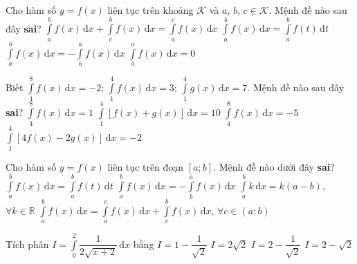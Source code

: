 \begin{ex}%
	Cho hàm số $y=f(x)$ liên tục trên khoảng $\mathscr{K}$ và $a$, $b$, $c\in \mathscr{K}$. Mệnh đề nào sau đây {\bf sai}?
	\choice
	{\True $\displaystyle\int\limits_a^b f(x)\mathrm{\,d}x+\displaystyle\int\limits_c^b f(x)\mathrm{\,d}x=\displaystyle\int\limits_a^c f(x)\mathrm{\,d}x$}
	{$\displaystyle\int\limits_a^b f(x)\mathrm{\,d}x=\displaystyle\int\limits_a^b f(t)\mathrm{\,d}t$}
	{$\displaystyle\int\limits_a^b f(x)\mathrm{\,d}x=-\displaystyle\int\limits_b^a f(x)\mathrm{\,d}x$}
	{$\displaystyle\int\limits_a^a f(x)\mathrm{\,d}x=0$}
\end{ex}
\begin{ex}%
	Biết $\displaystyle\int\limits_1^8 f(x)\mathrm{\,d}x=-2$; $\displaystyle\int\limits_1^4 f(x)\mathrm{\,d}x=3$; $\displaystyle\int\limits_1^4 g(x)\mathrm{\,d}x=7$. Mệnh đề nào sau đây \textbf{sai}?
	\choice
	{\True $\displaystyle\int\limits_4^8 f(x)\mathrm{\,d}x=1$}
	{$\displaystyle\int\limits_1^4[f(x)+g(x)]\mathrm{\,d}x=10$}
	{$\displaystyle\int\limits_4^8 f(x)\mathrm{\,d}x=-5$}
	{$\displaystyle\int\limits_1^4\left[4f(x)-2g(x)\right]\mathrm{\,d}x=-2$}
\end{ex}
\begin{ex}%
	Cho hàm số $y=f(x)$ liên tục trên đoạn $[a; b]$. Mệnh đề nào dưới đây \textbf{sai}?
	\choice
	{$\displaystyle\int\limits_a^b f(x)\mathrm{\,d}x=\displaystyle\int\limits_a^b f(t)\mathrm{\,d}t$}
	{$\displaystyle\int\limits_a^b f(x)\mathrm{\,d}x=-\displaystyle\int\limits_b^a f(x)\mathrm{\,d}x$}
	{\True $\displaystyle\int\limits_a^b k\mathrm{\,d}x=k(a-b)$, $\forall k\in\mathbb{R}$}
	{$\displaystyle\int\limits_a^b f(x)\mathrm{\,d}x=\displaystyle\int\limits_a^c f(x)\mathrm{\,d}x+\displaystyle\int\limits_c^b f(x)\mathrm{\,d}x$, $\forall c\in(a; b)$}
\end{ex}
\begin{ex}%
	Tích phân $I=\displaystyle\int\limits_0^2\dfrac{1}{2\sqrt{x+2}}\mathrm{\,d}x$ bằng
	\choice
	{$I=1-\dfrac{1}{\sqrt{2}}$}
	{$I=2\sqrt{2}$}
	{$I=2-\dfrac{1}{\sqrt{2}}$}
	{\True $I=2-\sqrt{2}$}
\end{ex}
